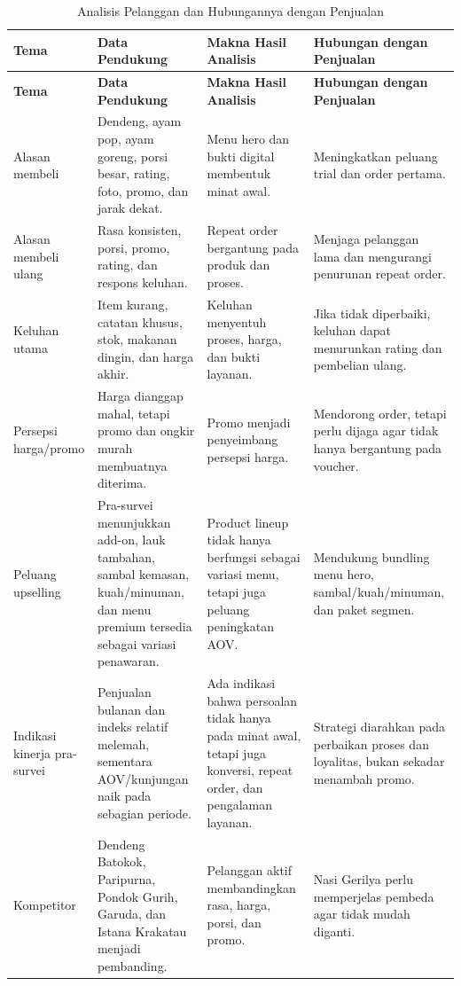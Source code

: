     \begin{xltabular}{\textwidth}{|Z{2.35cm}|Y|L{3.35cm}|L{3.35cm}|}
        \caption{Analisis Pelanggan dan Hubungannya dengan Penjualan}
        \label{tab:analisis-pelanggan-ulasan}\\
        \toprule
        \textbf{Tema} & \textbf{Data Pendukung} & \textbf{Makna Hasil Analisis} & \textbf{Hubungan dengan Penjualan} \\ \hline
        \midrule
        \endfirsthead
        \toprule
        \textbf{Tema} & \textbf{Data Pendukung} & \textbf{Makna Hasil Analisis} & \textbf{Hubungan dengan Penjualan} \\ \hline
        \midrule
        \endhead
        \endfoot
        \bottomrule
        \endlastfoot
        Alasan membeli & Dendeng, ayam pop, ayam goreng, porsi besar, rating, foto, promo, dan jarak dekat. & Menu hero dan bukti digital membentuk minat awal. & Meningkatkan peluang trial dan order pertama. \\ \hline
        Alasan membeli ulang & Rasa konsisten, porsi, promo, rating, dan respons keluhan. & Repeat order bergantung pada produk dan proses. & Menjaga pelanggan lama dan mengurangi penurunan repeat order. \\ \hline
        Keluhan utama & Item kurang, catatan khusus, stok, makanan dingin, dan harga akhir. & Keluhan menyentuh proses, harga, dan bukti layanan. & Jika tidak diperbaiki, keluhan dapat menurunkan rating dan pembelian ulang. \\ \hline
        Persepsi harga/promo & Harga dianggap mahal, tetapi promo dan ongkir murah membuatnya diterima. & Promo menjadi penyeimbang persepsi harga. & Mendorong order, tetapi perlu dijaga agar tidak hanya bergantung pada voucher. \\ \hline
        Peluang upselling & Pra-survei menunjukkan add-on, lauk tambahan, sambal kemasan, kuah/minuman, dan menu premium tersedia sebagai variasi penawaran. & Product lineup tidak hanya berfungsi sebagai variasi menu, tetapi juga peluang peningkatan AOV. & Mendukung bundling menu hero, sambal/kuah/minuman, dan paket segmen. \\ \hline
        Indikasi kinerja pra-survei & Penjualan bulanan dan indeks relatif melemah, sementara AOV/kunjungan naik pada sebagian periode. & Ada indikasi bahwa persoalan tidak hanya pada minat awal, tetapi juga konversi, repeat order, dan pengalaman layanan. & Strategi diarahkan pada perbaikan proses dan loyalitas, bukan sekadar menambah promo. \\ \hline
        Kompetitor & Dendeng Batokok, Paripurna, Pondok Gurih, Garuda, dan Istana Krakatau menjadi pembanding. & Pelanggan aktif membandingkan rasa, harga, porsi, dan promo. & Nasi Gerilya perlu memperjelas pembeda agar tidak mudah diganti. \\ \hline
    \end{xltabular}
\endgroup
